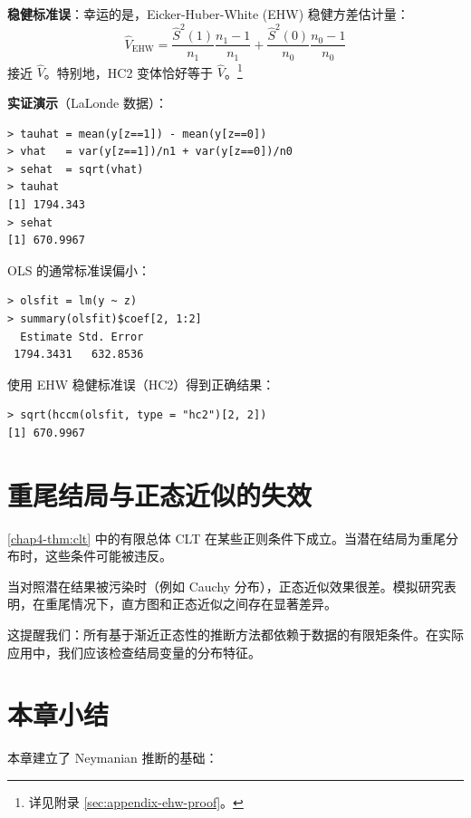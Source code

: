 \textbf{稳健标准误}：幸运的是，Eicker-Huber-White (EHW) 稳健方差估计量：
\begin{equation}\label{eq:4-5}
\hat{V}_{\text{EHW}} = \frac{\hat{S}^2(1)}{n_1}\frac{n_1-1}{n_1} + \frac{\hat{S}^2(0)}{n_0}\frac{n_0-1}{n_0}
\end{equation}
接近 $\hat{V}$。特别地，HC2 变体恰好等于 $\hat{V}$。\footnote{详见附录 \cref{sec:appendix-ehw-proof}。}

\textbf{实证演示}（LaLonde 数据）：
\begin{verbatim}
> tauhat = mean(y[z==1]) - mean(y[z==0])
> vhat   = var(y[z==1])/n1 + var(y[z==0])/n0
> sehat  = sqrt(vhat)
> tauhat
[1] 1794.343
> sehat
[1] 670.9967
\end{verbatim}

OLS 的通常标准误偏小：
\begin{verbatim}
> olsfit = lm(y ~ z)
> summary(olsfit)$coef[2, 1:2]
  Estimate Std. Error
 1794.3431   632.8536
\end{verbatim}

使用 EHW 稳健标准误（HC2）得到正确结果：
\begin{verbatim}
> sqrt(hccm(olsfit, type = "hc2")[2, 2])
[1] 670.9967
\end{verbatim}

\section{重尾结局与正态近似的失效}\label{sec:4-8}

\cref{chap4-thm:clt} 中的有限总体 CLT 在某些正则条件下成立。当潜在结局为重尾分布时，这些条件可能被违反。

当对照潜在结果被污染时（例如 Cauchy 分布），正态近似效果很差。模拟研究表明，在重尾情况下，直方图和正态近似之间存在显著差异。

这提醒我们：所有基于渐近正态性的推断方法都依赖于数据的有限矩条件。在实际应用中，我们应该检查结局变量的分布特征。

\section{本章小结}\label{sec:4-summary}

本章建立了 Neymanian 推断的基础：

